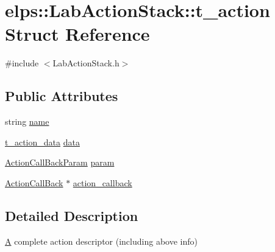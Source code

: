 \hypertarget{structelps_1_1_lab_action_stack_1_1t__action}{\section{elps\+:\+:Lab\+Action\+Stack\+:\+:t\+\_\+action Struct Reference}
\label{structelps_1_1_lab_action_stack_1_1t__action}
}


{\ttfamily \#include $<$Lab\+Action\+Stack.\+h$>$}

\subsection*{Public Attributes}
\begin{DoxyCompactItemize}
\item 
string \hyperlink{structelps_1_1_lab_action_stack_1_1t__action_acdc18958bac7c55da868d608a6860a85}{name}
\item 
\hyperlink{structelps_1_1_lab_action_stack_1_1t__action__data}{t\+\_\+action\+\_\+data} \hyperlink{structelps_1_1_lab_action_stack_1_1t__action_a7f63822bfba007763473fa78fe9497db}{data}
\item 
\hyperlink{namespaceelps_a25715773cecbf210efb08dff37b7b013}{Action\+Call\+Back\+Param} \hyperlink{structelps_1_1_lab_action_stack_1_1t__action_a99a344aa82b0e099c188d7efae094261}{param}
\item 
\hyperlink{namespaceelps_aa1ee9bc57556d61c2b7534818c6d5889}{Action\+Call\+Back} $\ast$ \hyperlink{structelps_1_1_lab_action_stack_1_1t__action_a4fda46c1a55ac7921c92fa2b30a123b4}{action\+\_\+callback}
\end{DoxyCompactItemize}


\subsection{Detailed Description}
\hyperlink{class_a}{A} complete action descriptor (including above info) 

